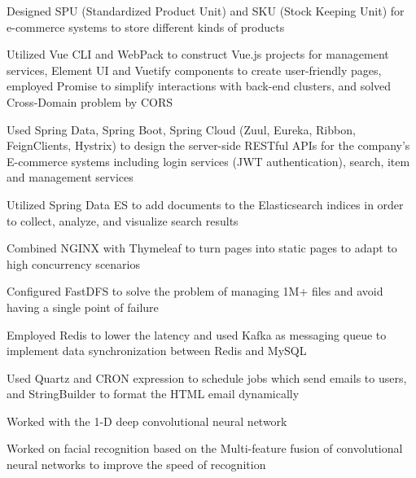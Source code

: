 \documentclass[]{deedy-resume-openfont}
\begin{document}
\begin{tightemize}
	\item Designed SPU (Standardized Product Unit) and SKU (Stock Keeping Unit) for e-commerce systems to store different kinds of products
	\item Utilized Vue CLI and WebPack to construct Vue.js projects for management services, Element UI and Vuetify components to create user-friendly pages, employed Promise to simplify interactions with back-end clusters, and solved Cross-Domain problem by CORS
	\item Used Spring Data, Spring Boot, Spring Cloud (Zuul, Eureka, Ribbon, FeignClients, Hystrix) to design the server-side RESTful APIs for the company’s E-commerce systems including login services (JWT authentication), search, item and management services
	\item Utilized Spring Data ES to add documents to the Elasticsearch indices in order to collect, analyze, and visualize search results
	\item Combined NGINX with Thymeleaf to turn pages into static pages to adapt to high concurrency scenarios
	\item Configured FastDFS to solve the problem of managing 1M+ files and avoid having a single point of failure
	\item Employed Redis to lower the latency and used Kafka as messaging queue to implement data synchronization between Redis and MySQL
	\item Used Quartz and CRON expression to schedule jobs which send emails to users, and StringBuilder to format the HTML email dynamically
\end{tightemize}
\sectionsep
{}\hfill {}
\begin{tightemize}
	\item Worked with the 1-D deep convolutional neural network
	\item Worked on facial recognition based on the Multi-feature fusion of convolutional neural networks to improve the speed of recognition
\end{tightemize}
\sectionsep
{}\hfill {}
\end{document}
